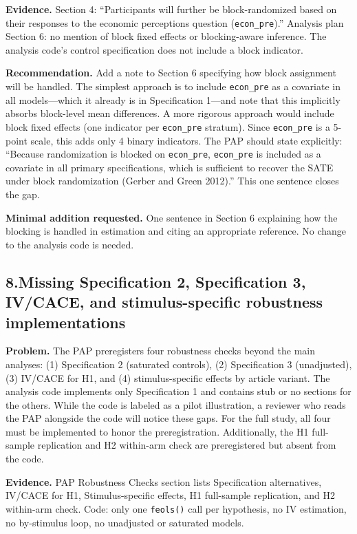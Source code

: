 \documentclass[11pt]{article}
\begin{document}
\textbf{Evidence.} Section 4: ``Participants will further be block-randomized based on their responses to the economic perceptions question (\texttt{econ\_pre}).'' Analysis plan Section 6: no mention of block fixed effects or blocking-aware inference. The analysis code's control specification does not include a block indicator.

\textbf{Recommendation.} Add a note to Section 6 specifying how block assignment will be handled. The simplest approach is to include \texttt{econ\_pre} as a covariate in all models---which it already is in Specification 1---and note that this implicitly absorbs block-level mean differences. A more rigorous approach would include block fixed effects (one indicator per \texttt{econ\_pre} stratum). Since \texttt{econ\_pre} is a 5-point scale, this adds only 4 binary indicators. The PAP should state explicitly: ``Because randomization is blocked on \texttt{econ\_pre}, \texttt{econ\_pre} is included as a covariate in all primary specifications, which is sufficient to recover the SATE under block randomization (Gerber and Green 2012).'' This one sentence closes the gap.

\textbf{Minimal addition requested.} One sentence in Section 6 explaining how the blocking is handled in estimation and citing an appropriate reference. No change to the analysis code is needed.

\bigskip

\subsection*{8.\enspace Missing Specification 2, Specification 3, IV/CACE, and stimulus-specific robustness implementations}

\textbf{Problem.} The PAP preregisters four robustness checks beyond the main analyses: (1) Specification 2 (saturated controls), (2) Specification 3 (unadjusted), (3) IV/CACE for H1, and (4) stimulus-specific effects by article variant. The analysis code implements only Specification 1 and contains stub or no sections for the others. While the code is labeled as a pilot illustration, a reviewer who reads the PAP alongside the code will notice these gaps. For the full study, all four must be implemented to honor the preregistration. Additionally, the H1 full-sample replication and H2 within-arm check are preregistered but absent from the code.

\textbf{Evidence.} PAP Robustness Checks section lists Specification alternatives, IV/CACE for H1, Stimulus-specific effects, H1 full-sample replication, and H2 within-arm check. Code: only one \texttt{feols()} call per hypothesis, no IV estimation, no by-stimulus loop, no unadjusted or saturated models.
\end{document}
